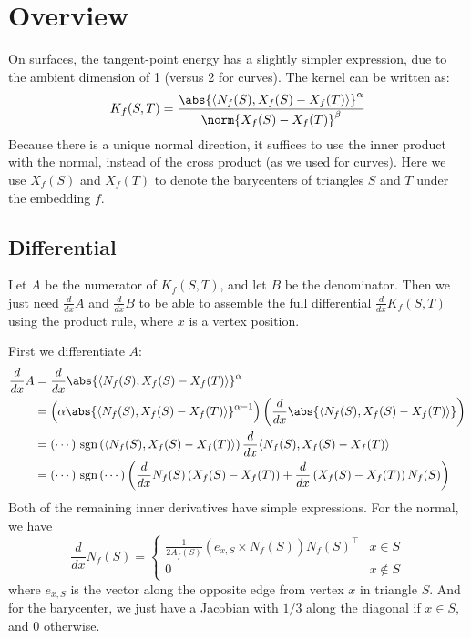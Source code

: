 \documentclass[11pt]{article}
\DeclarePairedDelimiter{\inner}{\langle}{\rangle}
\newcommand{\ddx}{\frac{d}{dx}}
\newcommand{\sgn}[1]{\ \textrm{sgn}\left(#1\right)}
\begin{document}

\thispagestyle{empty}

\section{Overview}

On surfaces, the tangent-point energy has a slightly simpler expression, due to the ambient dimension of 1 (versus 2 for curves). The kernel can be written as:
\begin{equation}
K_f(S, T) = \frac{\abs{\inner{N_f(S), X_f(S) - X_f(T)}}^{\alpha}}{\norm{X_f(S) - X_f(T)}^{\beta}}
\end{equation}
Because there is a unique normal direction, it suffices to use the inner product with the normal, instead of the cross product (as we used for curves). Here we use $X_f(S)$ and $X_f(T)$ to denote the barycenters of triangles $S$ and $T$ under the embedding $f$.

\subsection{Differential}

Let $A$ be the numerator of $K_f(S, T)$, and let $B$ be the denominator. Then we just need $\ddx A$ and $\ddx B$ to be able to assemble the full differential $\ddx K_f(S, T)$ using the product rule, where $x$ is a vertex position.

First we differentiate $A$:
\begin{align*}
\ddx A &= \ddx \abs{\inner{N_f(S), X_f(S) - X_f(T)}}^{\alpha}\\
&= \left(\alpha \abs{\inner{N_f(S), X_f(S) - X_f(T)}}^{\alpha - 1}\right) \left(\ddx \abs{\inner{N_f(S), X_f(S) - X_f(T)}}\right)\\
&= (\cdots) \sgn{\inner{N_f(S), X_f(S) - X_f(T)}} \ddx \inner{N_f(S), X_f(S) - X_f(T)}\\
&= (\cdots) \sgn{\cdots} \left(\ddx N_f(S) \left(X_f(S) - X_f(T)\right) + \ddx \left(X_f(S) - X_f(T)\right) N_f(S)\right)
\end{align*}
Both of the remaining inner derivatives have simple expressions. For the normal, we have
$$\ddx N_f(S) = \left\{
\begin{array}{lr}
\frac{1}{2 A_f(S)} (e_{x,S} \times N_f(S)) N_f(S)^{\top} & x \in S \\
0 & x \not\in S
\end{array}\right.$$
where $e_{x,S}$ is the vector along the opposite edge from vertex $x$ in triangle $S$. And for the barycenter, we just have a Jacobian with $1/3$ along the diagonal if $x \in S$, and 0 otherwise.
\end{document}
